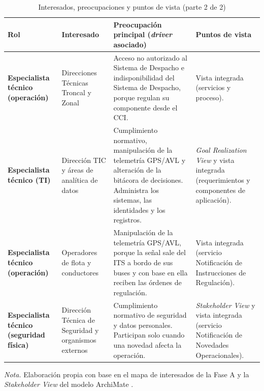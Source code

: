 \begin{table}[H]
	\caption{Interesados, preocupaciones y puntos de vista (parte 2 de 2)}
	\label{tab:interesados-2}
	\centering
	\footnotesize
	\renewcommand{\arraystretch}{1.15}
	\begin{tabularx}{\textwidth}{@{}>{\raggedright\arraybackslash}p{} Y Y Y@{}}
		\toprule
		\textbf{Rol} & \textbf{Interesado}                                                                                                                                                & \textbf{Preocupación principal (\textit{driver} asociado)} & \textbf{Puntos de vista} \\
		\midrule
		\textbf{Especialista técnico (operación)}
		             & Direcciones Técnicas Troncal y Zonal
		             & Acceso no autorizado al Sistema de Despacho e indisponibilidad del Sistema de Despacho, porque regulan su componente desde el CCI.
		             & Vista integrada (servicios y proceso).
		\\
		\midrule
		\textbf{Especialista técnico (TI)}
		             & Dirección TIC y áreas de analítica de datos
		             & Cumplimiento normativo, manipulación de la telemetría GPS/AVL y alteración de la bitácora de decisiones. Administra los sistemas, las identidades y los registros.
		             & \textit{Goal Realization View} y vista integrada (requerimientos y componentes de aplicación).
		\\
		\midrule
		\textbf{Especialista técnico (operación)}
		             & Operadores de flota y conductores
		             & Manipulación de la telemetría GPS/AVL, porque la señal sale del ITS a bordo de sus buses y con base en ella reciben las órdenes de regulación.
		             & Vista integrada (servicio Notificación de Instrucciones de Regulación).
		\\
		\midrule
		\textbf{Especialista técnico (seguridad física)}
		             & Dirección Técnica de Seguridad y organismos externos
		             & Cumplimiento normativo de seguridad y datos personales. Participan solo cuando una novedad afecta la operación.
		             & \textit{Stakeholder View} y vista integrada (servicio Notificación de Novedades Operacionales).
		\\
		\bottomrule
	\end{tabularx}

	\vspace{0.4em}
	\parbox{\textwidth}{\footnotesize \textit{Nota.} Elaboración propia con base en el mapa de interesados de la Fase A \parencite{fase1cci2026} y la \textit{Stakeholder View} del modelo ArchiMate \parencite{modeloArchimateCCI2026}.}
\end{table}

